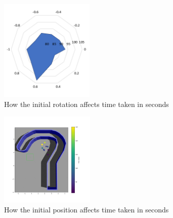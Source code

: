 \documentclass[conference]{IEEEtran}
\begin{document}
\begin{figure}[H]
    \centering
    \includegraphics[width=0.4\textwidth]{images/Rotation_timings.png}
    \caption{How the initial rotation affects time taken in seconds}
    \label{fig:rotation_radar_chart}
\end{figure}

\begin{figure}[H]
    \centering
    \includegraphics[width=0.4\textwidth]{images/heatMap_position.png}
    \caption{How the initial position affects time taken in seconds}
    \label{fig:position_heat_map}
\end{figure}
\end{document}

